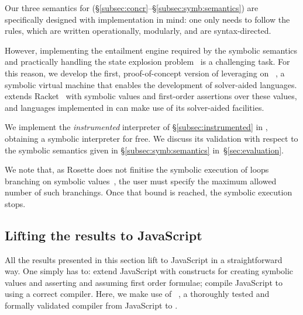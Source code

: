 Our three semantics for \jsil (\S\ref{subsec:concr}--\S\ref{subsec:symb:semantics}) are specifically designed with implementation in mind: one only needs to follow the rules, which are written operationally, modularly, and are syntax-directed. 

However, implementing the entailment engine required by the symbolic semantics and practically handling the state explosion problem~\cite{citemeimaturingawardwinner} is a challenging task. For this reason, we develop the first, proof-of-concept version of \cosette leveraging on 
\rosette~\cite{Rosette1,Rosette2}, a symbolic virtual machine that enables the development of solver-aided languages. \rosette extends Racket~\cite{racket} with symbolic values and first-order assertions over these values, and languages implemented in \rosette can make use of its solver-aided facilities. 

We implement the \emph{instrumented} \jsil interpreter of \S\ref{subsec:instrumented} in \rosette, obtaining a \jsil symbolic interpreter for free. We discuss its validation with respect to the symbolic semantics given in \S\ref{subsec:symb:semantics} in~\S\ref{sec:evaluation}.

We note that, as Rosette does not finitise the symbolic execution of loops branching on symbolic values~\cite{abstract:symbolic:exec}, the user must specify the maximum allowed number of such branchings. Once that bound is reached, the symbolic execution stops.


\subsection{Lifting the results to JavaScript}

All the results presented in this section lift to JavaScript in a straightforward way.
One simply has to: 
 extend JavaScript with constructs for creating symbolic values and 
asserting and assuming first order formulae; 
 compile JavaScript to \jsil using a correct compiler. 
Here, we make use of \jstojsil~\cite{javert}, a thoroughly tested and formally validated compiler from 
JavaScript to \jsil.
 
